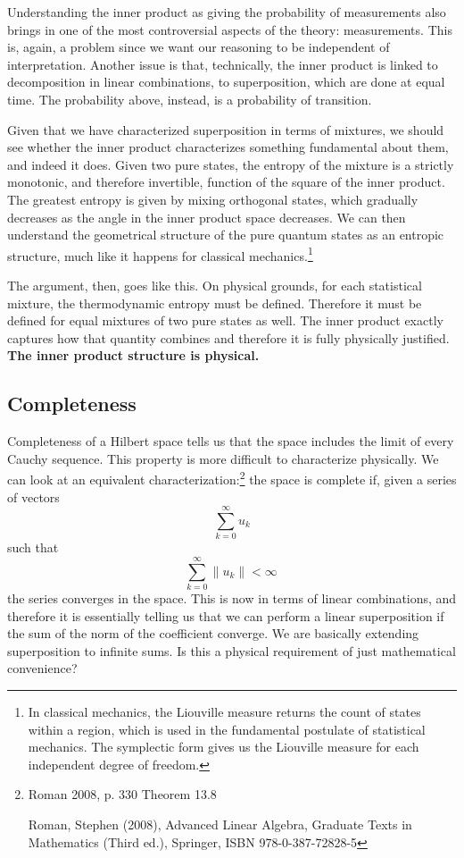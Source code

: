 \documentclass[10pt,twocolumn, nofootinbib]{revtex4-2}
\begin{document}
Understanding the inner product as giving the probability of measurements also brings in one of the most controversial aspects of the theory: measurements. This is, again, a problem since we want our reasoning to be independent of interpretation. Another issue is that, technically, the inner product is linked to decomposition in linear combinations, to superposition, which are done at equal time. The probability above, instead, is a probability of transition.

Given that we have characterized superposition in terms of mixtures, we should see whether the inner product characterizes something fundamental about them, and indeed it does. Given two pure states, the entropy of the mixture is a strictly monotonic, and therefore invertible, function of the square of the inner product. The greatest entropy is given by mixing orthogonal states, which gradually decreases as the angle in the inner product space decreases. We can then understand the geometrical structure of the pure quantum states as an entropic structure, much like it happens for classical mechanics.\footnote{In classical mechanics, the Liouville measure returns the count of states within a region, which is used in the fundamental postulate of statistical mechanics. The symplectic form gives us the Liouville measure for each independent degree of freedom.}

The argument, then, goes like this. On physical grounds, for each statistical mixture, the thermodynamic entropy must be defined. Therefore it must be defined for equal mixtures of two pure states as well. The inner product exactly captures how that quantity combines and therefore it is fully physically justified. \textbf{The inner product structure is physical.}

\subsection{Completeness}

Completeness of a Hilbert space tells us that the space includes the limit of every Cauchy sequence. This property is more difficult to characterize physically. We can look at an equivalent characterization:\footnote{Roman 2008, p. 330 Theorem 13.8
	
	Roman, Stephen (2008), Advanced Linear Algebra, Graduate Texts in Mathematics (Third ed.), Springer, ISBN 978-0-387-72828-5} the space is complete if, given a series of vectors
$$ \sum _{k=0}^{\infty }u_{k}$$
such that
$$ \sum _{k=0}^{\infty }\|u_{k}\|<\infty \,$$
the series converges in the space. This is now in terms of linear combinations, and therefore it is essentially telling us that we can perform a linear superposition if the sum of the norm of the coefficient converge. We are basically extending superposition to infinite sums. Is this a physical requirement of just mathematical convenience?
\end{document}
